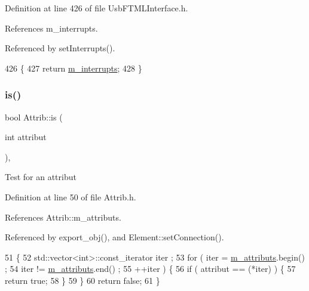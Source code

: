 Definition at line 426 of file Usb\+F\+T\+M\+L\+Interface.\+h.



References m\+\_\+interrupts.



Referenced by set\+Interrupts().


\begin{DoxyCode}
426                      \{
427     \textcolor{keywordflow}{return} \hyperlink{classUsbFTMLInterface_adb6a6a61e78d9b489e6ecefd5752d5ad}{m\_interrupts};
428   \}
\end{DoxyCode}
\mbox{\label{classAttrib_a704f26af560909ad22065083bb7d4c34}} 
\subsubsection{\texorpdfstring{is()}{is()}}
{\footnotesize\ttfamily bool Attrib\+::is (\begin{DoxyParamCaption}\item[{int}]{attribut }\end{DoxyParamCaption})\hspace{0.3cm}{\ttfamily [inline]}, {\ttfamily [inherited]}}

Test for an attribut 

Definition at line 50 of file Attrib.\+h.



References Attrib\+::m\+\_\+attributs.



Referenced by export\+\_\+obj(), and Element\+::set\+Connection().


\begin{DoxyCode}
51   \{
52     std::vector<int>::const\_iterator iter ;
53     \textcolor{keywordflow}{for} ( iter  = \hyperlink{classAttrib_ac4bd58a0cc6b38a3b711d609a3d3aacc}{m\_attributs}.begin() ;
54           iter != \hyperlink{classAttrib_ac4bd58a0cc6b38a3b711d609a3d3aacc}{m\_attributs}.end()   ;
55           ++iter ) \{
56       \textcolor{keywordflow}{if} ( attribut == (*iter) ) \{
57         \textcolor{keywordflow}{return} \textcolor{keyword}{true};
58       \}
59     \}
60     \textcolor{keywordflow}{return} \textcolor{keyword}{false};
61   \}
\end{DoxyCode}
\mbox{\label{classUsbFTMLInterface_ac94dcd155b2e060d5fe04ccfbbb4de8d}} 
